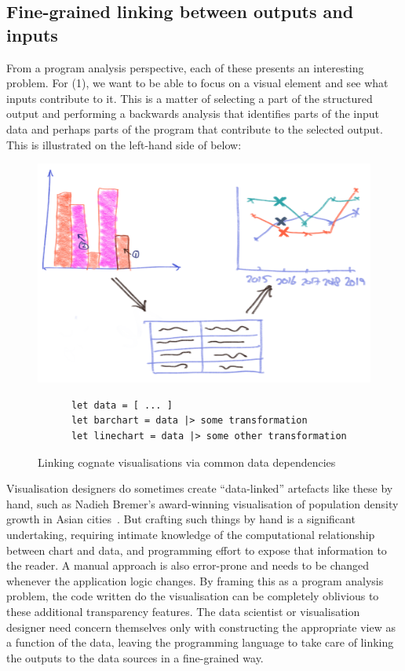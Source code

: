 \subsection{Fine-grained linking between outputs and inputs}

From a program analysis perspective, each of these presents an interesting problem. For (1), we want to be able to focus on a visual element and see what inputs contribute to it. This is a matter of selecting a part of the structured output and performing a backwards analysis that identifies parts of the input data and perhaps parts of the program that contribute to the selected output. This is illustrated on the left-hand side of  below:

\begin{figure}[H]
   {\includegraphics[scale=0.14]{fig/example/vis-linking.png}}
   \small
   \begin{lstlisting}
      let data = [ ... ]
      let barchart = data |> some transformation
      let linechart = data |> some other transformation
   \end{lstlisting}
   \caption{Linking cognate visualisations via common data dependencies}
   \label{fig:introduction:vis-linking}
\end{figure}

Visualisation designers do sometimes create ``data-linked'' artefacts like these by hand, such as Nadieh Bremer's award-winning visualisation of population density growth in Asian cities~\cite{bremer15}. But crafting such things by hand is a significant undertaking, requiring intimate knowledge of the computational relationship between chart and data, and programming effort to expose that information to the reader. A manual approach is also error-prone and needs to be changed whenever the application logic changes. By framing this as a program analysis problem, the code written do the visualisation can be completely oblivious to these additional transparency features. The data scientist or visualisation designer need concern themselves only with constructing the appropriate view as a function of the data, leaving the programming language to take care of linking the outputs to the data sources in a fine-grained way.

